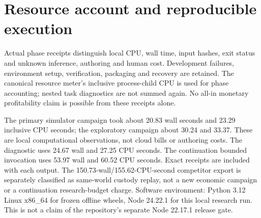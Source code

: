 \documentclass[11pt,a4paper]{article}
\begin{document}
\section{Resource account and reproducible execution}
Actual phase receipts distinguish local CPU, wall time, input hashes, exit status and unknown
inference, authoring and human cost. Development failures, environment setup, verification,
packaging and recovery are retained. The canonical resource meter's inclusive process-child
CPU is used for phase accounting; nested task diagnostics are not summed again.
No all-in monetary profitability claim is possible from these receipts alone.

The primary simulator campaign took about 20.83 wall seconds and 23.29 inclusive CPU seconds;
the exploratory campaign about 30.24 and 33.37. These are local computational observations,
not cloud bills or authoring costs. The diagnostic uses 24.67 wall and 27.25 CPU seconds. The continuation bounded invocation
uses 53.97 wall and 60.52 CPU seconds. Exact receipts are included with each output.
The 150.73-wall/155.62-CPU-second competitor export is separately classified as same-world
custody replay, not a new economic campaign or a continuation research-budget charge.
Software environment: Python 3.12 Linux x86\_64 for frozen offline wheels, Node 24.22.1 for this
local research run. This is not a claim of the repository's separate Node 22.17.1 release gate.
\end{document}
